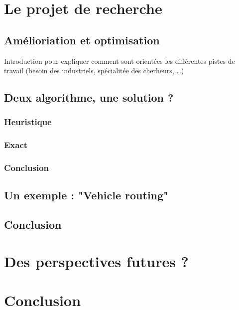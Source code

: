\documentclass[12pt]{article}
\begin{document}
    \section{Le projet de recherche}\label{sec:le-projet-de-recherche}

    \subsection{Amélioriation et optimisation}\label{subsec:amelioriation-et-optimisation}
    Introduction pour expliquer comment sont orientées les différentes pistes de travail
    (besoin des industriels, spécialitée des cherheurs, \ldots)
    \subsection{Deux algorithme, une solution ?}\label{subsec:deux-algorithme,-une-solution-?}
    \subsubsection{Heuristique}
    \subsubsection{Exact}
    \subsubsection{Conclusion}
    \subsection{Un exemple : "Vehicle routing"}\label{subsec:un-exemple-:-"vehicle-routing"}
    \subsection{Conclusion}\label{subsec:conclusion}


    \section{Des perspectives futures ?}\label{sec:des-perspectives-futures-?}


    \section{Conclusion}\label{sec:conclusion}
\end{document}
